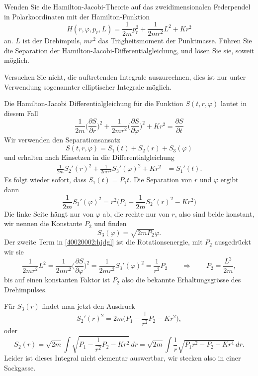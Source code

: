 Wenden Sie die Hamilton-Jacobi-Theorie auf das
zweidimensionalen Federpendel in Polarkoordinaten mit der Hamilton-Funktion 
\[
H(r,\varphi,p_r, L)=\frac1{2m}p_r^2+\frac1{2mr^2}L^2+Kr^2
\]
an.  $L$ ist der Drehimpuls, $mr^2$ das Trägheitsmoment
der Punktmasse.
Führen Sie die Separation der Hamilton-Jacobi-Differentialgleichung,
und lösen Sie sie, soweit möglich.

\begin{hinweis}
Versuchen Sie nicht, die auftretenden Integrale auszurechnen, dies
ist nur unter Verwendung sogenannter elliptischer Integrale möglich. 
\end{hinweis}

\begin{loesung}
Die Hamilton-Jacobi Differentialgleichung für die Funktion
$S(t,r,\varphi)$ lautet in diesem Fall
\begin{equation}
\frac1{2m}\biggl(\frac{\partial S}{\partial r}\biggr)^2
+\frac1{2mr^2}\biggl(\frac{\partial S}{\partial \varphi}\biggr)^2
+Kr^2
=
\frac{\partial S}{\partial t}
\label{40020002:hjdgl}
\end{equation}
Wir verwenden den Separationsansatz
\[
S(t,r,\varphi)=S_1(t)+S_2(r)+S_3(\varphi)
\]
und erhalten nach Einsetzen in die Differentialgleichung
\begin{align*}
\frac1{2m}S_2'(r)^2+\frac1{2mr^2}S_3'(\varphi)^2 + Kr^2&=S_1'(t).
\end{align*}
Es folgt wieder sofort, dass $S_1(t)=P_1t$.
Die Separation von $r$ und $\varphi$ ergibt dann
\[
\frac1{2m}S_3'(\varphi)^2=r^2\biggl(P_1-\frac1{2m}S_2'(r)^2-Kr^2\biggr)
\]
Die linke Seite hängt nur von $\varphi$ ab, die rechte nur von $r$,
also sind beide konstant, wir nennen die Konstante $P_2$ und finden
\[
S_3(\varphi)
=
\sqrt{2mP_2}\varphi.
\]
Der zweite Term in \eqref{40020002:hjdgl} ist die Rotationsenergie,
mit $P_2$ ausgedrückt wir sie
\[
\frac1{2mr^2}{L^2}
=
\frac1{2mr^2}\biggl(\frac{\partial S}{\partial \varphi}\biggr)^2
=
\frac1{2mr^2}S_3'(\varphi)^2=\frac1{r^2}P_2
\qquad\Rightarrow\qquad
P_2=\frac{L^2}{2m},
\]
bis auf einen konstanten Faktor ist $P_2$ also die bekannte Erhaltungsgrösse
des Drehimpulses.

Für $S_3(r)$ findet man jetzt den Ausdruck
\[
S_2'(r)^2=2m\biggl(P_1-\frac1{r^2}P_2-Kr^2\biggr),
\]
oder
\begin{equation}
S_2(r)
=
\sqrt{2m}\int\sqrt{P_1-\frac1{r^2}P_2-Kr^2}\,dr
=
\sqrt{2m}
\int
\frac1r
\sqrt{P_1r^2-P_2-Kr^4}\,dr.
\label{40020002:integral}
\end{equation}
Leider ist dieses Integral nicht elementar auswertbar, wir stecken also
in einer Sackgasse.
\end{loesung}


